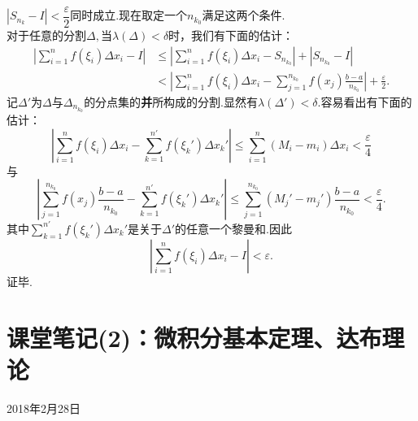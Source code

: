 \documentclass[UTF8]{article}
\begin{document}
    $|S_{n_k}-I|<\dfrac{\varepsilon}{2}$同时成立.现在取定一个$n_{k_0}$满足这两个条件.\\
    对于任意的分割$\Delta,$当$\lambda(\Delta)<\delta$时，我们有下面的估计：
    \begin{align*}
      \left|\sum_{i=1}^nf(\xi_i)\Delta x_i-I\right|&\le\left|\sum_{i=1}^nf(\xi_i)\Delta x_i-S_{n_{k_0}}\right|+|S_{n_{k_0}}-I|\\
      &<\left|\sum_{i=1}^nf(\xi_i)\Delta x_i-\sum_{j=1}^{n_{k_0}}f(x_j)\frac{b-a}{n_{k_0}}\right|+\frac{\varepsilon}{2}.
    \end{align*}
    记$\Delta'$为$\Delta$与$\Delta_{n_{k_0}}$的分点集的\textbf{并}所构成的分割.显然有$\lambda(\Delta')<\delta$.容易看出有下面的估计：
    $$\left|\sum_{i=1}^nf(\xi_i)\Delta x_i-\sum_{k=1}^{n'}f(\xi_k')\Delta x_k'\right|\le\sum_{i=1}^n(M_i-m_i)\Delta x_i<
    \frac{\varepsilon}{4}$$与
    $$\left|\sum_{j=1}^{n_{k_0}}f(x_j)\frac{b-a}{n_{k_0}}-\sum_{k=1}^{n'}f(\xi_k')\Delta x_k'\right|\le
    \sum_{j=1}^{n_{k_0}}(M_j'-m_j')\frac{b-a}{n_{k_0}}<\frac{\varepsilon}{4}.$$
    其中$\sum\limits_{k=1}^{n'}f(\xi_k')\Delta x_k'$是关于$\Delta'$的任意一个黎曼和.因此
    $$\left|\sum_{i=1}^nf(\xi_i)\Delta x_i-I\right|<\varepsilon.$$证毕.
\clearpage

\section{课堂笔记(2)：微积分基本定理、达布理论}
\begin{center}
  2018年2月28日
\end{center}
\end{document}
